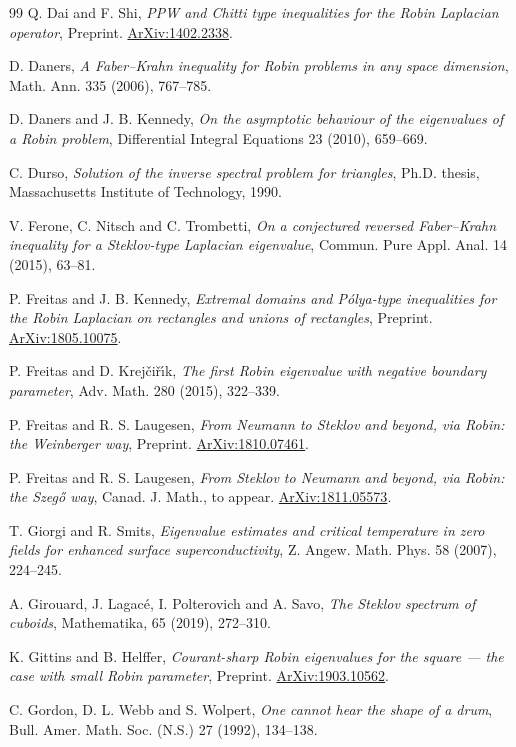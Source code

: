 \documentclass[12pt,reqno]{amsart}
\theoremstyle{definition}
\newcommand{\arxiv}[1]{%
 \href{http://front.math.ucdavis.edu/#1}{ArXiv:#1}}
\begin{document}
\begin{thebibliography}{99}
Q. Dai and F. Shi, \emph{PPW and Chitti type inequalities for the Robin Laplacian operator}, Preprint.
\arxiv{1402.2338}.

D. Daners, \emph{A Faber--Krahn inequality for Robin problems in any space
  dimension}, Math. Ann. 335 (2006), 767--785.

D. Daners and J. B. Kennedy, \emph{On the asymptotic behaviour of the eigenvalues of a Robin problem}, Differential Integral Equations 23 (2010), 659--669. 

C. Durso, \emph{Solution of the inverse spectral problem for triangles}, Ph.D. thesis, Massachusetts Institute of Technology, 1990.

V. Ferone, C. Nitsch and C. Trombetti, \emph{On a conjectured reversed
  {F}aber--{K}rahn inequality for a {S}teklov-type {L}aplacian eigenvalue},
  Commun. Pure Appl. Anal. 14 (2015), 63--81.

P. Freitas and J. B. Kennedy, \emph{Extremal domains and P\'{o}lya-type inequalities for the Robin Laplacian on rectangles and unions of rectangles}, Preprint. \arxiv{1805.10075}.

P. Freitas and D. Krej\v{c}i\v{r}\'{\i}k, \emph{The first {R}obin eigenvalue
  with negative boundary parameter}, Adv. Math. 280 (2015), 322--339.

P. Freitas and R. S. Laugesen, \emph{From Neumann to Steklov and beyond, via Robin: the Weinberger way}, Preprint. \arxiv{1810.07461}.

P. Freitas and R. S. Laugesen, \emph{From Steklov to Neumann and beyond, via Robin: the Szeg\H{o} way}, Canad. J. Math., to appear. \arxiv{1811.05573}.

T. Giorgi and R. Smits, \emph{Eigenvalue estimates and critical temperature in zero fields for enhanced surface superconductivity}, Z. Angew. Math. Phys. 58 (2007), 224--245. 

 A. Girouard, J. Lagac\'{e}, I. Polterovich and A. Savo, \emph{The Steklov spectrum of cuboids}, Mathematika, 65 (2019), 272--310. 

 K. Gittins and B. Helffer, \emph{Courant-sharp Robin eigenvalues for the square --- the case with small Robin parameter}, Preprint. \arxiv{1903.10562}.

C. Gordon, D. L. Webb and S. Wolpert, \emph{One cannot hear the shape of a drum},  
Bull. Amer. Math. Soc. (N.S.) 27 (1992), 134--138. 


\end{thebibliography}
\end{document}
